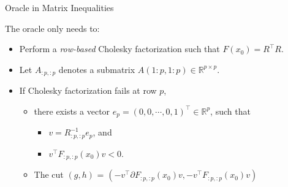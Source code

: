 \documentclass[10pt,ignorenonframetext,serif,onlymath]{beamer}
\providecommand{\tightlist}{%
  \setlength{\itemsep}{0pt}\setlength{\parskip}{0pt}}
\begin{document}
\begin{frame}{Oracle in Matrix Inequalities}
\protect\hypertarget{sec:oracle-in-matrix-inequalities}{}

The oracle only needs to:

\begin{itemize}
\tightlist
\item
  Perform a \emph{row-based} Cholesky factorization such that
  \(F(x_0) = R^\top R\).
\item
  Let \(A_{:p,:p}\) denotes a submatrix
  \(A(1:p, 1:p) \in \mathbb{R}^{p\times p}\).
\item
  If Cholesky factorization fails at row \(p\),

  \begin{itemize}
  \tightlist
  \item
    there exists a vector
    \(e_p = (0, 0, \cdots, 0, 1)^\top \in \mathbb{R}^p\), such that

    \begin{itemize}
    \tightlist
    \item
      \(v = R_{:p,:p}^{-1} e_p\), and
    \item
      \(v^\top F_{:p,:p}(x_0) v < 0\).
    \end{itemize}
  \item
    The cut \((g, h)\) =
    \((-v^\top \partial F_{:p,:p}(x_0) v, -v^\top F_{:p,:p}(x_0) v)\)
  \end{itemize}
\end{itemize}

\end{frame}
\end{document}

